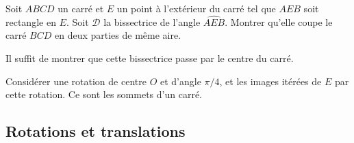 \begin{exo}
Soit $ABCD$ un carré et $E$ un point à l'extérieur du carré tel que $AEB$ soit rectangle en $E$. Soit $\mathcal D$ la bissectrice de l'angle $\widehat{AEB}$. Montrer qu'elle coupe le carré $BCD$ en deux parties de même aire.
\begin{hint}
Il suffit de montrer que cette bissectrice passe par le centre du carré.
\end{hint}
\begin{sol}
Considérer une rotation de centre $O$ et d'angle $\pi/4$, et les images itérées de $E$ par cette rotation. Ce sont les sommets d'un carré.
\end{sol}
\end{exo}


\subsection{Rotations et translations}


